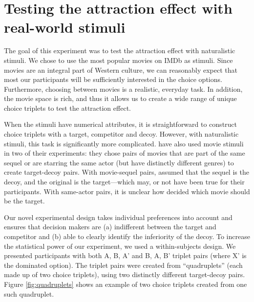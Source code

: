 \documentclass[12pt, a4paper]{article}
\begin{document}
\section{Testing the attraction effect with real-world stimuli}

The goal of this experiment was to test the attraction effect with naturalistic stimuli. We chose to use the most popular movies on IMDb as stimuli. Since movies are an integral part of Western culture, we can reasonably expect that most our participants will be sufficiently interested in the choice options. Furthermore, choosing between movies is a realistic, everyday task. In addition, the movie space is rich, and thus it allows us to create a wide range of unique choice triplets to test the attraction effect.

When the stimuli have numerical attributes, it is straightforward to construct choice triplets with a target, competitor and decoy. However, with naturalistic stimuli, this task is significantly more complicated.  have also used movie stimuli in two of their experiments: they chose pairs of movies that are part of the same sequel or are starring the same actor (but have distinctly different genres) to create target-decoy pairs. With movie-sequel pairs, \citeauthor{Frederick2014} assumed that the sequel is the decoy, and the original is the target---which may, or not have been true for their participants. With same-actor pairs, it is unclear how \citeauthor{Frederick2014} decided which movie should be the target. 

Our novel experimental design takes individual preferences into account and ensures that decision makers are (a) indifferent between the target and competitor and (b) able to clearly identify the inferiority of the decoy. To increase the statistical power of our experiment, we used a within-subjects design. We presented participants with both A, B, A' and B, A, B' triplet pairs (where X' is the dominated option). The triplet pairs were created from ``quadruplets'' (each made up of two choice triplets), using two distinctly different target-decoy pairs. Figure \ref{fig:quadruplets} shows an example of two choice triplets created from one such quadruplet.
\end{document}

